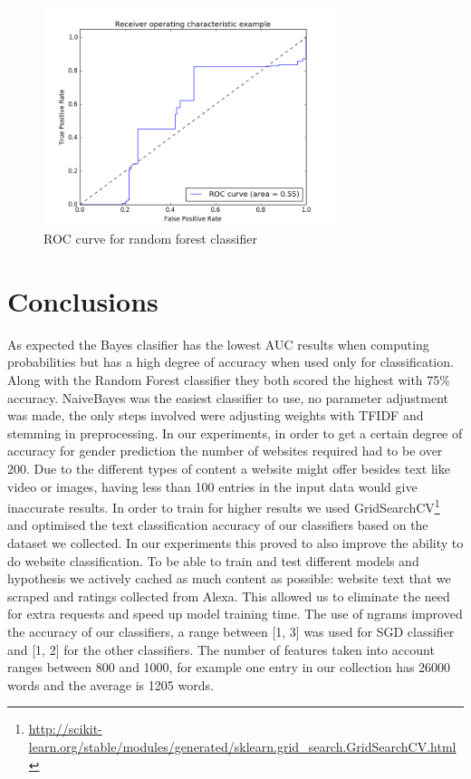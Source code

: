 \begin{figure}[ht!]
\centering
\includegraphics[width=23em]{images/out_forest.png}
\caption{ROC curve for random forest classifier}
\end{figure}

\FloatBarrier
\section{Conclusions}
As expected the Bayes clasifier has the lowest AUC results when computing probabilities but has a high degree of accuracy when used only for classification. Along with the Random Forest classifier they both scored the highest with 75\% accuracy. NaiveBayes was the easiest classifier to use, no parameter adjustment was made, the only steps involved were adjusting weights with TFIDF and stemming in preprocessing.
\newline
In our experiments, in order to get a certain degree of accuracy for gender prediction the number of websites required had to be over 200. Due to the different types of content a website might offer besides text like video or images, having less than 100 entries in the input data would give inaccurate results.
\newline
In order to train for higher results we used GridSearchCV\footnote{\url{http://scikit-learn.org/stable/modules/generated/sklearn.grid_search.GridSearchCV.html}} and optimised the text classification accuracy of our classifiers based on the dataset we collected. In our experiments this proved to also improve the ability to do website classification. To be able to train and test different models and hypothesis we actively cached as much content as possible: website text that we scraped and ratings collected from Alexa. This allowed us to eliminate the need for extra requests and speed up model training time.
\newline
The use of ngrams improved the accuracy of our classifiers, a range between [1, 3] was used for SGD classifier and [1, 2] for the other classifiers. The number of features taken into account ranges between 800 and 1000, for example one entry in our collection has 26000 words and the average is 1205 words.
